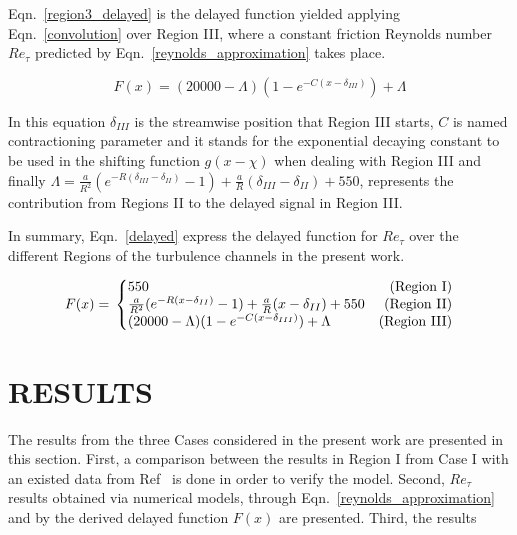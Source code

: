 \documentclass[twocolumn,10pt]{asme2e}
\begin{document}
Eqn.~\ref{region3_delayed} is the delayed function yielded applying Eqn.~\ref{convolution} over Region III, where a constant friction Reynolds number \(Re_{\tau}\) predicted by Eqn.~\ref{reynolds_approximation} takes place.

\begin{equation}
F(x)= (20000-{\Lambda})(1-e^{-C(x-{\delta}_{III})})+{\Lambda}
\label{region3_delayed}
\end{equation}

In this equation \({\delta}_{III}\) is the streamwise position that Region III starts, \(C\) is named contractioning parameter and it stands for the exponential decaying constant to be used in the shifting function \(g(x-\chi)\) when dealing with Region III and finally
 \({\Lambda}=\frac{a}{R^2}(e^{-R({\delta}_{III}-{\delta}_{II})}-1)+\frac{a}{R}({\delta}_{III}-{\delta}_{II})+550\), represents the contribution from Regions II to the delayed signal in Region III.

In summary, Eqn.~\eqref{delayed} express the delayed function for \(Re_{\tau}\) over the different Regions of the turbulence channels in the present work. 

\begin{equation} \label{delayed}
F(x) = \\
    \left\{\begin{array}{@{}lr@{}}
        550  & \text{(Region I)}\\
        \frac{a}{R^2}(e^{-R(x-{\delta}_{II})}-1)+\frac{a}{R}(x-{\delta}_{II})+550 & \text{(Region II)}\\
        (20000-{\Lambda})(1-e^{-C(x-{\delta}_{III})})+{\Lambda} &  \text{(Region III)}
\end{array}\right.
\end{equation}




\section*{RESULTS}

The results from the three Cases considered in the present work are presented in this section. First, a comparison between the results in Region I from Case I with an existed data from Ref~\cite{iwamoto2002} is done in order to verify the model. Second, \(Re_{\tau}\) results obtained via numerical models, through Eqn.~\ref{reynolds_approximation} and by the derived delayed function \(F(x)\) are presented. Third, the results 
\end{document}
